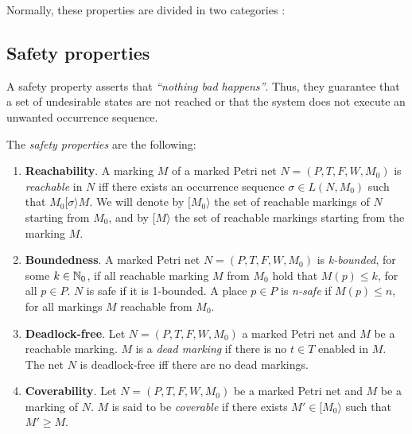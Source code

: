 \medskip
Normally, these properties are divided in two categories \cite{citar}:

\subsection{Safety properties}
A safety property asserts that \emph{``nothing bad happens''}.
Thus, they guarantee that a set of undesirable states are not reached or that
the system does not execute an unwanted occurrence sequence.

The \emph{safety properties} are the following:

\begin{enumerate}
\item {\bf Reachability}. A marking $M$ of a marked Petri net
$N= (P,T,F,W,M_0)$ is {\it reachable} in $N$
iff there exists an occurrence sequence $\sigma \in L(N,M_0)$
such that $M_0 [ \sigma \rangle M$. We will denote by $[M_0\rangle$ the
set of reachable markings of $N$ starting from $M_0$, and
by $[ M \rangle$ the set of reachable markings starting from the marking $M$.

\item {\bf Boundedness}. A marked Petri net $N=(P,T,F,W,M_0)$ 
is {\it k-bounded}, for some $k \in \mathbb{N}_{0}$, if all reachable marking
$M$ from $M_0$ hold that $M(p) \leq k$, for all $p \in P$. $N$ is safe if
it is 1-bounded. A place $p \in P$ is
{\it n-safe} if $M(p) \leq n$, for all markings $M$ reachable from $M_0$.

\item {\bf Deadlock-free}. Let $N=(P,T,F,W,M_0)$ a marked Petri net and $M$ be a reachable marking.
$M$ is a {\it dead marking} if there is no $t \in T$ enabled in $M$. 
The net $N$ is deadlock-free iff there are no dead markings.

\item {\bf Coverability}.
Let $N=(P,T,F,W,M_0)$ be a marked Petri net and $M$ be a marking of $N$.
$M$ is said to be {\it coverable} if there exists $M' \in
[M_0 \rangle$ such that $M' \geq M$.
\end{enumerate}

